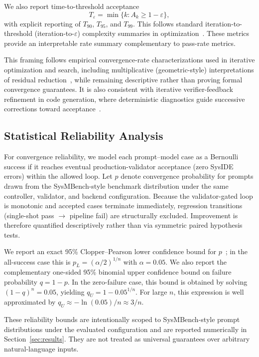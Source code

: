 We also report time-to-threshold acceptance
\[
T_{\varepsilon} = \min\{k : A_k \ge 1-\varepsilon\},
\]
with explicit reporting of $T_{90}$, $T_{95}$, and $T_{99}$. This follows standard iteration-to-threshold (iteration-to-$\varepsilon$) complexity summaries in optimization~\cite{polyak1987introductionOptimization}. These metrics provide an interpretable rate summary complementary to pass-rate metrics.

This framing follows empirical convergence-rate characterizations used in iterative optimization and search, including multiplicative (geometric-style) interpretations of residual reduction~\cite{he2016averageConvergenceRate}, while remaining descriptive rather than proving formal convergence guarantees. It is also consistent with iterative verifier-feedback refinement in code generation, where deterministic diagnostics guide successive corrections toward acceptance~\cite{wang2022compilable,grubisic2024compiler}.

\subsection{Statistical Reliability Analysis}
For convergence reliability, we model each prompt--model case as a Bernoulli success if it reaches eventual production-validator acceptance (zero SysIDE errors) within the allowed loop. Let $p$ denote convergence probability for prompts drawn from the SysMBench-style benchmark distribution under the same controller, validator, and backend configuration. Because the validator-gated loop is monotonic and accepted cases terminate immediately, regression transitions (single-shot pass $\rightarrow$ pipeline fail) are structurally excluded. Improvement is therefore quantified descriptively rather than via symmetric paired hypothesis tests.


We report an exact 95\% Clopper--Pearson lower confidence bound for $p$~\cite{clopper1934confidenceLimits}; in the all-success case this is $p_L=(\alpha/2)^{1/n}$ with $\alpha=0.05$. We also report the complementary one-sided 95\% binomial upper confidence bound on failure probability $q=1-p$. In the zero-failure case, this bound is obtained by solving $(1-q)^n=0.05$, yielding $q_U=1-0.05^{1/n}$. For large $n$, this expression is well approximated by $q_U\approx-\ln(0.05)/n\approx 3/n$.

These reliability bounds are intentionally scoped to SysMBench-style prompt distributions under the evaluated configuration and are reported numerically in Section~\ref{sec:results}. They are not treated as universal guarantees over arbitrary natural-language inputs.

